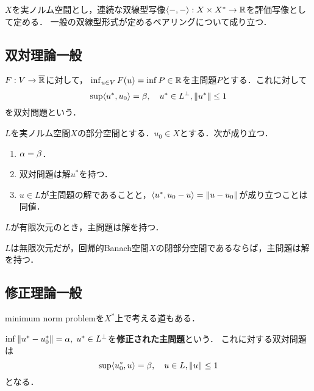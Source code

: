 \documentclass[uplatex,dvipdfmx]{jsreport}
\begin{document}
\begin{notation}
    $X$を実ノルム空間とし，連続な双線型写像$\langle-,-\rangle:X\times X^*\to\mathbb{R}$を評価写像として定める．
    一般の双線型形式が定めるペアリングについて成り立つ．
\end{notation}

\subsection{双対理論一般}

\begin{definition}
    $F:V\to\overline{\mathbb{R}}$に対して，
    $\inf_{u\in V}F(u)=\inf P\in\mathbb{R}$を主問題$P$とする．これに対して
    \[\sup\langle u^*,u_0\rangle=\beta,\quad u^*\in L^\perp,\|u^*\|\le1\]
    を双対問題という．
\end{definition}

\begin{theorem}
    $L$を実ノルム空間$X$の部分空間とする．$u_0\in X$とする．次が成り立つ．
    \begin{enumerate}
        \item $\alpha=\beta$．
        \item 双対問題は解$u^*$を持つ．
        \item $u\in L$が主問題の解であることと，$\langle u^*,u_0-u\rangle=\|u-u_0\|$が成り立つことは同値．
    \end{enumerate}
\end{theorem}

\begin{corollary}
    $L$が有限次元のとき，主問題は解を持つ．
\end{corollary}

\begin{remark}
    $L$は無限次元だが，回帰的Banach空間$X$の閉部分空間であるならば，主問題は解を持つ．
\end{remark}

\subsection{修正理論一般}

\begin{tcolorbox}[colframe=ForestGreen, colback=ForestGreen!10!white,breakable,colbacktitle=ForestGreen!40!white,coltitle=black,fonttitle=\bfseries\sffamily,
title=]
    minimum norm problemを$X^*$上で考える道もある．
\end{tcolorbox}

\begin{definition}
    $\inf\|u^*-u_0^*\|=\alpha,\;u^*\in L^\perp$を\textbf{修正された主問題}という．
    これに対する双対問題は
    \[\sup\langle u^*_0,u\rangle=\beta,\quad u\in L,\|u\|\le 1\]
    となる．
\end{definition}
\end{document}
